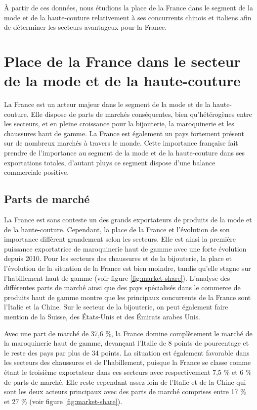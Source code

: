 \documentclass[french,10pt,a4paper]{article}
\begin{document}
\bigskip

À partir de ces données, nous étudions la place de la France dans le segment de la mode et de la haute-couture relativement à ses concurrents chinois et italiens afin de déterminer les secteurs avantageux pour la France.

\section{Place de la France dans le secteur de la mode et de la haute-couture}
La France est un acteur majeur dans le segment de la mode et de la haute-couture. Elle dispose de parts de marchés conséquentes, bien qu'hétérogènes entre les secteurs, et en pleine croissance pour la bijouterie, la maroquinerie et les chaussures haut de gamme. La France est également un pays fortement présent sur de nombreux marchés à travers le monde. Cette importance française fait prendre de l'importance au segment de la mode et de la haute-couture dans ses exportations totales, d'autant pluys ce segment dispose d'une balance commerciale positive.


\subsection{Parts de marché}
La France est sans conteste un des grands exportateurs de produits de la mode et de la haute-couture. Cependant, la place de la France et l'évolution de son importance diffèrent grandement selon les secteurs. Elle est ainsi la première puissance exportatrice de maroquinerie haut de gamme avec une forte évolution depuis 2010. Pour les secteurs des chaussures et de la bijouterie, la place et l'évolution de la situation de la France est bien moindre, tandis qu'elle stagne sur l'habillement haut de gamme (voir figure \ref{fig:market-share}). L'analyse des différentes parts de marché ainsi que des pays spécialisés dans le commerce de produits haut de gamme montre que les principaux concurrents de la France sont l'Italie et la Chine. Sur le secteur de la bijouterie, on peut également faire mention de la Suisse, des États-Unis et des Émirats arabes Unis.

\bigskip

Avec une part de marché de 37,6 \%, la France domine complètement le marché de la maroquinerie haut de gamme, devançant l'Italie de 8 points de pourcentage et le reste des pays par plus de 34 points. La situation est également favorable dans les secteurs des chaussures et de l'habillement, puisque la France se classe comme étant le troisième exportateur dans ces secteurs avec respectivement 7,5 \% et 6 \% de parts de marché. Elle reste cependant assez loin de l'Italie et de la Chine qui sont les deux acteurs principaux avec des parts de marché comprises entre 17 \% et 27 \% (voir figure \ref{fig:market-share}).
\end{document}
